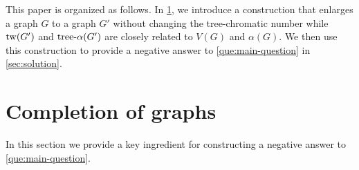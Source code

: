 \documentclass[a4paper, cleveref, autoref, thm-restate]{lipics-v2021}
\newcommand{\T}{\mathcal{T}}
\newcommand{\twG}{{\rm tw}(G)}
\newcommand{\tw}{{\rm tw}}
\newcommand{\treeaG}{{\rm tree\textnormal{-}}\alpha(G)}
\newcommand{\treea}{{\rm tree}\textnormal{-}\alpha}
\newcommand{\treexG}{{\rm tree\textnormal{-}}\chi(G)}
\begin{document}
This paper is organized as follows.
In \cref{sec:construction}, we introduce a construction that enlarges a graph $G$ to a graph $G'$ without changing the tree-chromatic number while $\tw(G')$ and $\treea(G')$ are closely related to $V(G)$ and $\alpha(G)$.
We then use this construction to provide a negative answer to \cref{que:main-question} in \cref{sec:solution}.


%
%
%


%

\section{Completion of graphs}
\label{sec:construction}

In this section we provide a key ingredient for constructing a negative answer to \cref{que:main-question}. 
\end{document}
